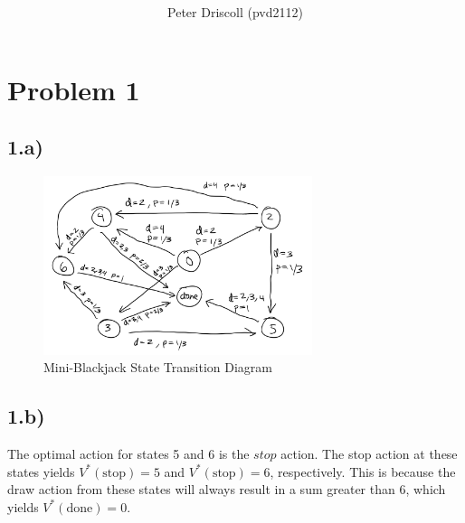 \documentclass[11pt]{article}
\title{%
  \titlefont{COMS W4701: Artificial Intelligence, Spring 2025} \\
\subtitlefont{Homework \#3}} %
\author{Peter Driscoll (pvd2112)} %
\begin{document}
\maketitle

\section*{Problem 1}

\subsection*{1.a)}
\begin{figure}[H]
\centering
\includegraphics[width=0.7\textwidth]{images/Figure_1.jpg}
\vspace{1em}

\caption{Mini-Blackjack State Transition Diagram}
\label{fig:1}
\end{figure}

\subsection*{1.b)}
The optimal action for states 5 and 6 is the $stop$ action. The stop action at these states yields $V^*(\text{stop}) = 5$ and $V^*(\text{stop}) = 6$, respectively.
This is because the draw action from these states will always result in a sum greater than 6, which yields $V^*(\text{done}) = 0$.

\pagebreak
\end{document}
